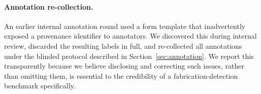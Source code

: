 \paragraph{Annotation re-collection.} An earlier internal annotation
round used a form template that inadvertently exposed a provenance
identifier to annotators. We discovered this during internal review,
discarded the resulting labels in full, and re-collected all
annotations under the blinded protocol described in
Section~\ref{sec:annotation}. We report this transparently because we
believe disclosing and correcting such issues, rather than omitting
them, is essential to the credibility of a fabrication-detection
benchmark specifically.
